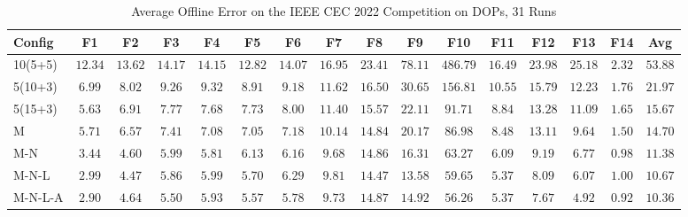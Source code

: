 \begin{table*}
  \centering
  \caption{Average Offline Error on the IEEE CEC 2022 Competition on DOPs, 31 Runs}
  \begin{tabular}{l|cccccccccccccc|c}
    Config & F1 & F2 & F3 & F4 & F5 & F6 & F7 & F8 & F9 & F10 & F11 & F12 & F13 & F14 & Avg \\
    \hline
    10(5+5) & $12.34$ & $13.62$ & $14.17$ & $14.15$ & $12.82$ & $14.07$ & $16.95$ & $23.41$ & $78.11$ & $486.79$ & $16.49$ & $23.98$ & $25.18$ & $2.32$ & $53.88$\\
    5(10+3) & $6.99$ & $8.02$ & $9.26$ & $9.32$ & $8.91$ & $9.18$ & $11.62$ & $16.50$ & $30.65$ & $156.81$ & $10.55$ & $15.79$ & $12.23$ & $1.76$ & $21.97$\\
    5(15+3) & $5.63$ & $6.91$ & $7.77$ & $7.68$ & $7.73$ & $8.00$ & $11.40$ & $15.57$ & $22.11$ & $91.71$ & $8.84$ & $13.28$ & $11.09$ & $1.65$ & $15.67$\\
    \hline
    M & $5.71$ & $6.57$ & $7.41$ & $7.08$ & $7.05$ & $7.18$ & $10.14$ & $14.84$ & $20.17$ & $86.98$ & $8.48$ & $13.11$ & $9.64$ & $1.50$ & $14.70$\\
    M-N & $3.44$ & $4.60$ & $5.99$ & \cellcolor{lightgray!65}$\mathbf{5.81}$ & $6.13$ & $6.16$ & \cellcolor{lightgray!65}$\mathbf{9.68}$ & $14.86$ & $16.31$ & $63.27$ & $6.09$ & $9.19$ & $6.77$ & $0.98$ & $11.38$\\
    M-N-L & $2.99$ & \cellcolor{lightgray!65}$\mathbf{4.47}$ & $5.86$ & $5.99$ & $5.70$ & $6.29$ & $9.81$ & \cellcolor{lightgray!65}$\mathbf{14.47}$ & \cellcolor{lightgray!65}$\mathbf{13.58}$ & $59.65$ & \cellcolor{lightgray!65}$\mathbf{5.37}$ & $8.09$ & $6.07$ & $1.00$ & $10.67$\\
    M-N-L-A & \cellcolor{lightgray!65}$\mathbf{2.90}$ & $4.64$ & \cellcolor{lightgray!65}$\mathbf{5.50}$ & $5.93$ & \cellcolor{lightgray!65}$\mathbf{5.57}$ & \cellcolor{lightgray!65}$\mathbf{5.78}$ & $9.73$ & $14.87$ & $14.92$ & \cellcolor{lightgray!65}$\mathbf{56.26}$ & $5.37$ & \cellcolor{lightgray!65}$\mathbf{7.67}$ & \cellcolor{lightgray!65}$\mathbf{4.92}$ & \cellcolor{lightgray!65}$\mathbf{0.92}$ & \cellcolor{lightgray!65}$\mathbf{10.36}$\\
  \end{tabular}
\end{table*}
